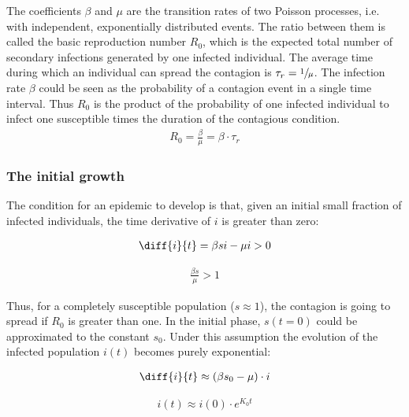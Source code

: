 \documentclass[DIV=12, BCOR=0pt]{scrartcl}  %
\begin{document}
  The coefficients $\beta$ and $\mu$ are the transition rates of two Poisson processes, i.e. with independent, exponentially distributed events. The ratio between them is called the basic reproduction number $R_0$, which is the expected total number of secondary infections generated by one infected individual.   
  The average time during which an individual can spread the contagion is $\tau_{r} = \sfrac{1}{\mu}$. The infection rate $\beta$ could be seen as the probability of a contagion event in a single time interval. Thus $R_0$ is the product of the probability of one infected individual to infect one susceptible times the duration of the contagious condition.
  \begin{align}
			R_0 = \frac{\beta}{\mu} = \beta \cdot \tau_{r}
			\label{eq:R0}
  \end{align}

  \subsubsection{The initial growth}
  The condition for an epidemic to develop is that, given an initial small fraction of infected individuals, the time derivative of $i$ is greater than zero:
  
  \begin{align}
  	\diff{i}{t} = \beta s i - \mu i > 0 
  	\label{sir_growthCond}
  \end{align}

  \begin{align} %
  	\frac{\beta s}{\mu} > 1  %
  	\label{eq:sir_growthReq}
  \end{align}
  
  Thus, for a completely susceptible population ($s \approx 1$), the contagion is going to spread if $R_0$ is greater than one. In the initial phase, $s(t=0)$ could be approximated to the constant $s_0$.
  Under this assumption the evolution of the infected population $i(t)$ becomes purely exponential:
  
  \begin{align}
  	\diff{i}{t} \approx  (\beta s_0 - \mu) \cdot i 
  	\label{eq:sir_approxi}
  \end{align}

  \begin{align} %
  	i(t) \approx i(0) \cdot e^{K_0 t} 
  	\label{eq:sir_growthK0}
  \end{align}
\end{document}
